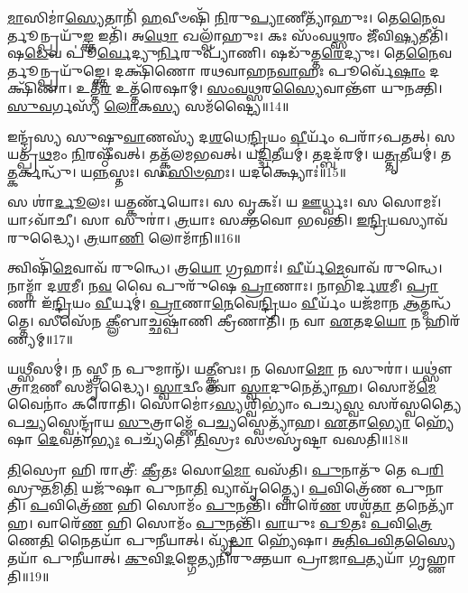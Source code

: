\-\ul{𑌮𑌾}\-𑌸𑌿𑌮𑌾॑\-\ul{𑌸𑍍𑌯𑍇}\-𑌤𑌾𑌨𑌿᳴ \ul{𑌹}\-𑌵𑍀𑍞𑌷𑌿᳴ \ul{𑌨𑌿}\-𑌰𑍁\-\ul{𑌪𑍍𑌯𑌾}\-𑌣𑍀𑌤𑍍𑌯𑌾᳴𑌹𑍁𑌃।
𑌤𑍇\-\ul{𑌨𑍈}\-𑌵𑌰𑍍𑌤𑍂𑌨𑍍𑌪𑍍𑌰𑌯𑍁᳴\-\ul{𑌙𑍍𑌕𑍍𑌤} 𑌇𑌤𑌿᳴।
𑌅\-\ul{𑌥𑍋} 𑌖𑌲𑍍𑌵𑌾᳴𑌹𑍁𑌃।
𑌕𑌃 𑌸𑌂᳴𑌵\-\ul{𑌥𑍍𑌸}\-𑌰𑌂 𑌜𑍀᳴𑌵𑌿\-\ul{𑌷𑍍𑌯}\-𑌤𑍀𑌤𑌿᳴।
𑌷\-\ul{𑌡𑍇}\-𑌵 𑌪𑍂॑\-\ul{𑌰𑍍𑌵𑍇}\-𑌦𑍍𑌯𑍁\-\ul{𑌰𑍍𑌨𑌿}\-𑌰𑍁𑌪𑍍𑌯𑌾᳴𑌣𑌿।
𑌷𑌡𑍁᳴𑌤𑍍𑌤\-\ul{𑌰𑍇}\-𑌦𑍍𑌯𑍁𑌃।
𑌤𑍇\-\ul{𑌨𑍈}\-𑌵𑌰𑍍𑌤𑍂𑌨𑍍𑌪𑍍𑌰𑌯𑍁᳴𑌙𑍍𑌕𑍍𑌤𑍇।
𑌦𑌕𑍍𑌷𑌿᳴𑌣𑍋 𑌰𑌥𑌵𑌾𑌹𑌨\-\ul{𑌵𑌾}\-𑌹𑌃 𑌪𑍂𑌰𑍍𑌵𑍇᳴\-\ul{𑌷𑌾𑌂} 𑌦𑌕𑍍𑌷𑌿᳴𑌣𑌾।
𑌉𑌤𑍍𑌤᳴\-\ul{𑌰} 𑌉𑌤𑍍𑌤᳴𑌰𑍇𑌷𑌾𑌮𑍍।
\-\ul{𑌸𑌂}\-\-\ul{𑌵}\-\-\ul{𑌥𑍍𑌸}\-𑌰\-\ul{𑌸𑍍𑌯𑍈}\-𑌵𑌾𑌨𑍍𑌤𑍗᳴ 𑌯𑍁𑌨𑌕𑍍𑌤𑌿।
\-\ul{𑌸𑍁}\-\-\ul{𑌵}\-𑌰𑍍𑌗𑌸𑍍𑌯᳴ \ul{𑌲𑍋}\-𑌕\-\ul{𑌸𑍍𑌯} 𑌸𑌮᳴𑌷𑍍𑌟𑍍𑌯𑍈॥14॥\anuvakamend[\-\ul{𑌤𑍍𑌵𑌾}\-𑌷𑍍𑌟𑍍𑌰\-\ul{𑌮}\-𑌷𑍍𑌟𑌾\-𑌕᳴𑌪𑌾𑌲𑌂 𑌦𑌧𑌤𑍇 𑌯𑍁\-\ul{𑌨}\-𑌕𑍍𑌤𑍍𑌯𑍇𑌕𑌂᳴ 𑌚]

𑌇𑌨𑍍𑌦𑍍𑌰᳴𑌸𑍍𑌯 𑌸𑍁𑌷𑍁\-\ul{𑌵𑌾}\-𑌣𑌸𑍍𑌯᳴ 𑌦\-\ul{𑌶}\-𑌧𑍇\-\ul{𑌨𑍍𑌦𑍍𑌰𑌿}\-𑌯𑌂 \ul{𑌵𑍀}\-𑌰𑍍𑌯𑌂᳴ 𑌪𑌰𑌾᳴\-𑌽𑌪𑌤𑌤𑍍।
𑌸 𑌯𑌤𑍍𑌪𑍍𑌰᳴\-\ul{𑌥}\-𑌮𑌂 \ul{𑌨𑌿}\-𑌰𑌷𑍍𑌠𑍀᳴𑌵𑌤𑍍।
𑌤𑌤𑍍𑌕𑍍𑌵᳴𑌲𑌮𑌭𑌵𑌤𑍍।
𑌯\-\ul{𑌦𑍍𑌦𑍍𑌵𑌿}\-𑌤𑍀𑌯𑌮𑍍॑।
𑌤𑌦𑍍𑌬𑌦᳴𑌰𑌮𑍍।
𑌯\-\ul{𑌤𑍍𑌤𑍃}\-𑌤𑍀𑌯𑌮𑍍॑।
𑌤\-\ul{𑌤𑍍𑌕}\-𑌰𑍍𑌕𑌨𑍍𑌧𑍁᳴।
𑌯\-\ul{𑌨𑍍𑌨}\-𑌸𑍍𑌤𑌃।
𑌸 \ul{𑌸𑌿}\-\-\ul{𑍞}\-𑌹𑌃।
𑌯𑌦𑌕𑍍𑌷𑍍𑌯𑍋𑌃॑॥15॥

𑌸 𑌶𑌾॑\-\ul{𑌰𑍍𑌦𑍂}\-𑌲𑌃।
𑌯𑌤𑍍𑌕𑌰𑍍𑌣᳴𑌯𑍋𑌃।
𑌸 𑌵𑍃𑌕𑌃᳴।
𑌯 \ul{𑌊}\-𑌰𑍍𑌧𑍍𑌵𑌃।
𑌸 𑌸𑍋𑌮𑌃᳴।
𑌯𑌾𑌽𑌵𑌾᳴𑌚𑍀।
𑌸𑌾 𑌸𑍁𑌰𑌾॑।
\-\ul{𑌤𑍍𑌰}\-𑌯𑌾𑌃 𑌸𑌕𑍍𑌤᳴𑌵𑍋 𑌭𑌵𑌨𑍍𑌤𑌿।
\-\ul{𑌇}\-\-\ul{𑌨𑍍𑌦𑍍𑌰𑌿}\-𑌯𑌸𑍍𑌯𑌾𑌵᳴𑌰𑍁𑌦𑍍𑌧𑍍𑌯𑍈।
\-\ul{𑌤𑍍𑌰}\-𑌯𑌾\-\ul{𑌣𑌿} 𑌲𑍋𑌮𑌾᳴𑌨𑌿॥16॥

𑌤𑍍𑌵𑌿𑌷𑌿᳴\-\ul{𑌮𑍇}\-𑌵𑌾𑌵᳴ 𑌰𑍁𑌨𑍍𑌧𑍇।
𑌤𑍍𑌰\-\ul{𑌯𑍋} 𑌗𑍍𑌰𑌹𑌾𑌃॑।
\-\ul{𑌵𑍀}\-𑌰𑍍𑌯᳴\-\ul{𑌮𑍇}\-𑌵𑌾𑌵᳴ 𑌰𑍁𑌨𑍍𑌧𑍇।
𑌨𑌾𑌮𑍍𑌨𑌾᳴ 𑌦\-\ul{𑌶}\-𑌮𑍀।
𑌨\-\ul{𑌵} 𑌵𑍈 𑌪𑍁𑌰𑍁᳴𑌷𑍇 \ul{𑌪𑍍𑌰𑌾}\-𑌣𑌾𑌃।
𑌨𑌾𑌭𑌿᳴𑌰𑍍𑌦\-\ul{𑌶}\-𑌮𑍀।
\-\ul{𑌪𑍍𑌰𑌾}\-𑌣𑌾 𑌇᳴\-\ul{𑌨𑍍𑌦𑍍𑌰𑌿}\-𑌯𑌂 \ul{𑌵𑍀}\-𑌰𑍍𑌯𑌮𑍍॑।
\-\ul{𑌪𑍍𑌰𑌾}\-𑌣𑌾\-\ul{𑌨𑍇}\-𑌵𑍇\-\ul{𑌨𑍍𑌦𑍍𑌰𑌿}\-𑌯𑌂 \ul{𑌵𑍀}\-𑌰𑍍𑌯𑌂᳴ 𑌯𑌜᳴𑌮𑌾𑌨 \ul{𑌆}\-𑌤𑍍𑌮𑌨𑍍𑌧᳴𑌤𑍍𑌤𑍇।
𑌸𑍀𑌸𑍇᳴𑌨 \ul{𑌕𑍍𑌲𑍀}\-𑌬𑌾𑌚𑍍𑌛𑌷𑍍𑌪𑌾᳴𑌣𑌿 𑌕𑍍𑌰𑍀𑌣𑌾𑌤𑌿।
𑌨 𑌵𑌾 \ul{𑌏}\-𑌤𑌦\-\ul{𑌯𑍋} 𑌨 𑌹𑌿𑌰᳴𑌣𑍍𑌯𑌮𑍍॥17॥

𑌯𑌥𑍍𑌸𑍀𑌸𑌮𑍍॑।
𑌨 𑌸𑍍𑌤𑍍𑌰𑍀 𑌨 𑌪𑍁𑌮𑌾𑌨𑍍᳴।
𑌯\-\ul{𑌤𑍍𑌕𑍍𑌲𑍀}\-𑌬𑌃।
𑌨 𑌸𑍋\-\ul{𑌮𑍋} 𑌨 𑌸𑍁𑌰𑌾॑।
𑌯𑌥𑍍𑌸𑍗॑𑌤𑍍𑌰𑌾\-\ul{𑌮}\-𑌣𑍀 𑌸𑌮𑍃᳴𑌦𑍍𑌧𑍍𑌯𑍈।
\-\ul{𑌸𑍍𑌵𑌾}\-𑌦𑍍𑌵𑍀𑌂 𑌤𑍍𑌵𑌾॑ \ul{𑌸𑍍𑌵𑌾}\-𑌦𑍁𑌨𑍇𑌤𑍍𑌯𑌾᳴𑌹।
𑌸𑍋𑌮᳴\-\ul{𑌮𑍇}\-𑌵𑍈𑌨𑌾𑌂॑ 𑌕𑌰𑍋𑌤𑌿।
𑌸𑍋𑌮𑍋॑\-𑌽\-\ul{𑌸𑍍𑌯}\-𑌶𑍍𑌵𑌿𑌭𑍍𑌯𑌾𑌂॑ 𑌪𑌚𑍍𑌯\-\ul{𑌸𑍍𑌵} 𑌸𑌰᳴𑌸𑍍𑌵𑌤𑍍𑌯𑍈 𑌪\-\ul{𑌚𑍍𑌯}\-𑌸𑍍𑌵𑍇𑌨𑍍𑌦𑍍𑌰𑌾᳴𑌯 \ul{𑌸𑍁}\-𑌤𑍍𑌰𑌾𑌮𑍍𑌣𑍇᳴ 𑌪\-\ul{𑌚𑍍𑌯}\-𑌸𑍍𑌵𑍇𑌤𑍍𑌯𑌾᳴𑌹।
\-\ul{𑌏}\-𑌤𑌾\-\ul{𑌭𑍍𑌯𑍋} 𑌹𑍍𑌯𑍇᳴𑌷𑌾 \ul{𑌦𑍇}\-𑌵𑌤𑌾॑\-\ul{𑌭𑍍𑌯𑌃} 𑌪𑌚𑍍𑌯᳴𑌤𑍇।
\-\ul{𑌤𑌿}\-𑌸𑍍𑌰𑌃 𑌸𑍞𑌸𑍃᳴𑌷𑍍𑌟𑌾 𑌵𑌸𑌤𑌿॥18॥

\-\ul{𑌤𑌿}\-𑌸𑍍𑌰𑍋 𑌹𑌿 𑌰𑌾𑌤𑍍𑌰𑍀॑: \ul{𑌕𑍍𑌰𑍀}\-𑌤𑌃 𑌸𑍋\-\ul{𑌮𑍋} 𑌵𑌸᳴𑌤𑌿।
\-\ul{𑌪𑍁}\-𑌨𑌾𑌤𑍁᳴ 𑌤𑍇 𑌪\-\ul{𑌰𑌿}\-𑌸𑍍𑌰𑍁\-\ul{𑌤}\-𑌮𑌿\-\ul{𑌤𑌿} 𑌯𑌜𑍁᳴𑌷𑌾 𑌪𑍁𑌨𑌾\-\ul{𑌤𑌿} 𑌵𑍍𑌯𑌾𑌵𑍃᳴𑌤𑍍𑌤𑍍𑌯𑍈।
\-\ul{𑌪}\-𑌵𑌿𑌤𑍍𑌰𑍇᳴𑌣 𑌪𑍁𑌨𑌾𑌤𑌿।
\-\ul{𑌪}\-𑌵𑌿𑌤𑍍𑌰𑍇᳴\-\ul{𑌣} 𑌹𑌿 𑌸𑍋𑌮𑌂᳴ \ul{𑌪𑍁}\-𑌨𑌨𑍍𑌤𑌿᳴।
𑌵𑌾𑌰𑍇᳴\-\ul{𑌣} 𑌶𑌶𑍍𑌵᳴\-\ul{𑌤𑌾} 𑌤𑌨𑍇𑌤𑍍𑌯𑌾᳴𑌹।
𑌵𑌾𑌰𑍇᳴\-\ul{𑌣} 𑌹𑌿 𑌸𑍋𑌮𑌂᳴ \ul{𑌪𑍁}\-𑌨𑌨𑍍𑌤𑌿᳴।
\-\ul{𑌵𑌾}\-𑌯𑍁𑌃 \ul{𑌪𑍂}\-𑌤𑌃 \ul{𑌪}\-𑌵𑌿\-\ul{𑌤𑍍𑌰𑍇}\-𑌣𑍇\-\ul{𑌤𑌿} 𑌨𑍈𑌤𑌯𑌾᳴ 𑌪𑍁𑌨𑍀𑌯𑌾𑌤𑍍।
𑌵𑍍𑌯𑍃᳴\-\ul{𑌦𑍍𑌧𑌾} 𑌹𑍍𑌯𑍇᳴𑌷𑌾।
\-\ul{𑌅}\-\-\ul{𑌤𑌿}\-\-\ul{𑌪}\-\-\ul{𑌵𑌿}\-𑌤\-\ul{𑌸𑍍𑌯𑍈}\-𑌤𑌯𑌾᳴ 𑌪𑍁𑌨𑍀𑌯𑌾𑌤𑍍।
\-\ul{𑌕𑍁}\-𑌵𑌿\-\ul{𑌦}\-𑌙𑍍𑌗𑍇𑌤𑍍𑌯𑌨𑌿᳴𑌰𑍁𑌕𑍍𑌤𑌯𑌾 𑌪𑍍𑌰𑌾𑌜𑌾\-\ul{𑌪}\-𑌤𑍍𑌯𑌯𑌾᳴ 𑌗𑍃𑌹𑍍𑌣𑌾𑌤𑌿॥19॥

